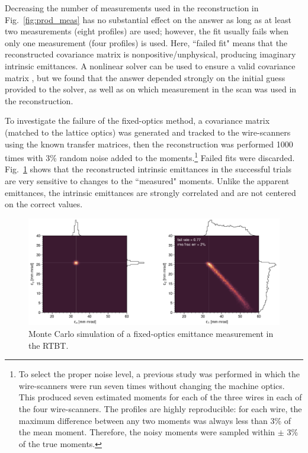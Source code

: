 Decreasing the number of measurements used in the reconstruction in Fig.~\ref{fig:prod_meas} has no substantial effect on the answer as long as at least two measurements (eight profiles) are used; however, the fit usually fails when only one measurement (four profiles) is used. Here, ``failed fit" means that the reconstructed covariance matrix is nonpositive/unphysical, producing imaginary intrinsic emittances. A nonlinear solver can be used to ensure a valid covariance matrix \cite{Raimondi1993}, but we found that the answer depended strongly on the initial guess provided to the solver, as well as on which measurement in the scan was used in the reconstruction.

To investigate the failure of the fixed-optics method, a covariance matrix (matched to the lattice optics) was generated and tracked to the wire-scanners using the known transfer matrices, then the reconstruction was performed 1000 times with 3\% random noise added to the moments.\footnote{To select the proper noise level, a previous study was performed in which the wire-scanners were run seven times without changing the machine optics. This produced seven estimated moments for each of the three wires in each of the four wire-scanners. The profiles are highly reproducible: for each wire, the maximum difference between any two moments was always less than 3\% of the mean moment. Therefore, the noisy moments were sampled within $\pm$ 3\% of the true moments.} Failed fits were discarded. Fig.~\ref{fig:prod_sensitivity} shows that the reconstructed intrinsic emittances in the successful trials are very sensitive to changes to the ``measured" moments. Unlike the apparent emittances, the intrinsic emittances are strongly correlated and are not centered on the correct values.
%
\begin{figure}[!p]
    \vspace*{5cm}
    \includegraphics[width=\textwidth]{Images/chapter4/prod_sensitivity3.png}
    \caption{Monte Carlo simulation of a fixed-optics emittance measurement in the RTBT.}
    \label{fig:prod_sensitivity}
    \vspace*{5cm}
\end{figure}
%

